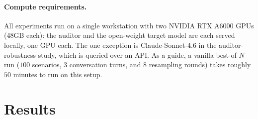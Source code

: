 \documentclass{article}
\theoremstyle{plain}
\theoremstyle{definition}
\theoremstyle{remark}
\begin{document}
\paragraph{Compute requirements.} All experiments run on a single workstation with two NVIDIA RTX A6000 GPUs (48GB each): the auditor and the open-weight target model are each served locally, one GPU each. The one exception is Claude-Sonnet-4.6 in the auditor-robustness study, which is queried over an API.
As a guide, a vanilla best-of-$N$ run ($100$ scenarios, $3$ conversation turns, and $8$ resampling rounds) takes roughly $50$ minutes to run on this setup.







\section{Results}
\end{document}
